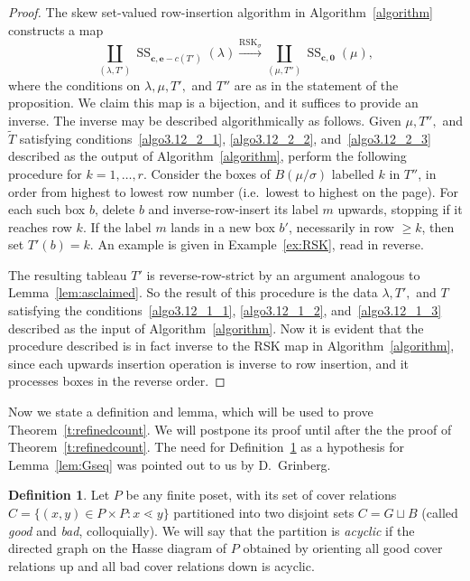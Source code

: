 \documentclass[11pt]{article}
\theoremstyle{definition}
\newtheorem{defi}[theorem]{Definition}
\newcommand{\ie}{i.e.\ }
\DeclareMathOperator{\Semi}{SS}
\newcommand{\bfc}{\mathbf{c}}
\newcommand{\bfe}{\mathbf{e}}
\newcommand{\wt}{\widetilde}
\begin{document}
\begin{proof}
 The skew set-valued row-insertion algorithm in Algorithm~\ref{algorithm} constructs a map
\begin{equation}\label{eq:ssmap}
\coprod_{(\lambda, T')} \Semi_{\bfc, \bfe-c(T')}(\lambda) \xrightarrow{\text{RSK}_\sigma}\coprod_{(\mu,T'')} \Semi_{\bfc, \mathbf{0}}(\mu),
\end{equation}
where the conditions on $\lambda,\mu,T',$ and $T''$ are as in the statement of the proposition. We claim this map is a bijection, and it suffices to provide an inverse. The inverse may be described algorithmically as follows. Given $\mu, T'',$ and $\wt T$ satisfying conditions~\eqref{algo3.12_2_1}, \eqref{algo3.12_2_2}, and~\eqref{algo3.12_2_3} described as the output of Algorithm~\ref{algorithm}, perform the following procedure for $k=1,\ldots, r$. Consider the boxes of $B(\mu/\sigma)$ labelled $k$ in $T''$, in order from highest to lowest row number (\ie lowest to highest on the page). For each such box $b$, delete $b$ and inverse-row-insert its label $m$ upwards, stopping if it reaches row $k$. If the label $m$ lands in a new box $b'$, necessarily in row $\ge k$, then set $T'(b) = k$. An example is given in Example~\ref{ex:RSK}, read in reverse.

The resulting tableau $T'$ is reverse-row-strict by an argument analogous to Lemma~\ref{lem:asclaimed}. So the result of this procedure is the data $\lambda,T',$ and $T$ satisfying the conditions~\eqref{algo3.12_1_1}, \eqref{algo3.12_1_2}, and~\eqref{algo3.12_1_3} described as the input of Algorithm~\ref{algorithm}. 
Now it is evident that the procedure described is in fact inverse to the RSK map in Algorithm~\ref{algorithm}, since each upwards insertion operation is inverse to row insertion, and it processes boxes in the reverse order.
\end{proof}

Now we state a definition and lemma, which will be used to prove Theorem~\ref{t:refinedcount}. We will postpone its proof until after the the proof of Theorem~\ref{t:refinedcount}. The need for Definition~\ref{def:acyclic} as a hypothesis for Lemma~\ref{lem:Gseq} was pointed out to us by D.~Grinberg.

\begin{defi}\label{def:acyclic}
Let $P$ be any finite poset, with its set of cover relations $C = \{(x,y)\in P\times P: x\lessdot y\}$ partitioned into two disjoint sets $C=G\sqcup B$ (called \emph{good} and \emph{bad}, colloquially). We will say that the partition is \emph{acyclic} if the directed graph on the Hasse diagram of $P$ obtained by orienting all good cover relations up and all bad cover relations down is acyclic.
\end{defi}
\end{document}
